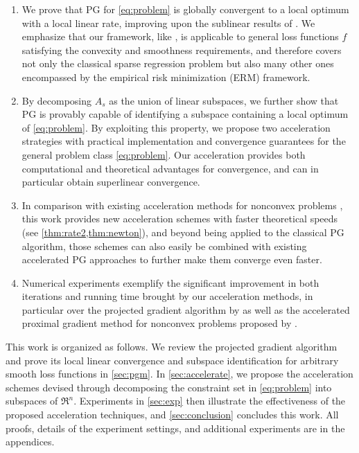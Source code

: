 \documentclass{article}
\theoremstyle{plain}
\theoremstyle{definition}
\theoremstyle{remark}
\begin{document}
\begin{enumerate}[leftmargin=*]
	\item We prove that PG for \cref{eq:problem} is globally 
	convergent to a local optimum with a local linear rate, improving upon the sublinear results of \citet{BKM16}. We emphasize 
	that our framework, like 
	\citep{BKM16}, is applicable to 
	general loss functions $f$ satisfying the convexity and smoothness requirements, and therefore 
	covers not only the classical sparse regression problem but also
	many other ones encompassed by the empirical risk minimization
	(ERM) framework.
	
	\item By decomposing $A_s$ as the union of linear subspaces,
		we further show that PG is provably capable of identifying a subspace containing a 
	local optimum of \cref{eq:problem}.
	By exploiting this property,
	we propose 
	two acceleration strategies with practical implementation and convergence
	guarantees
	for the general problem class \cref{eq:problem}. 
	Our acceleration provides both computational and theoretical
	advantages for convergence, and can in particular obtain
	superlinear convergence.
	
	\item In comparison with existing acceleration methods for
		nonconvex problems \citep{NIPS2015_f7664060,WCP18}, this work
		provides new acceleration schemes with faster theoretical speeds
		(see \cref{thm:rate2,thm:newton}), and beyond being applied to
		the classical PG algorithm,
		those schemes can
	also easily be combined with existing accelerated PG approaches to
	further make them converge even faster.
	\item Numerical experiments exemplify the significant improvement
		in both iterations and running time brought by our
	acceleration methods, in particular over the projected gradient
	algorithm by \cite{BKM16} as well as the accelerated proximal
	gradient method for nonconvex problems proposed by
	\cite{NIPS2015_f7664060}.
\end{enumerate}

This work is organized as follows. We review the projected gradient algorithm 
and prove its local linear convergence and subspace identification
for arbitrary smooth loss functions in \cref{sec:pgm}. In \cref{sec:accelerate}, 
we propose the acceleration schemes devised through
decomposing the constraint set in \cref{eq:problem} into
subspaces of $\Re^n$.
Experiments in \cref{sec:exp} then illustrate the effectiveness of
the proposed acceleration techniques, and \cref{sec:conclusion} concludes this
work.
All proofs, details of the experiment settings, and additional
experiments are in the appendices.
\end{document}
